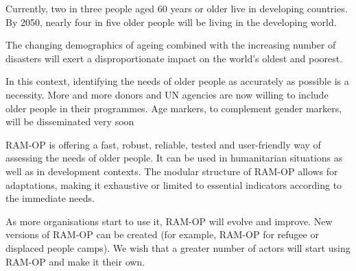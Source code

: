 \documentclass[12pt,a4paper]{book}
\theoremstyle{definition}
\theoremstyle{definition}
\theoremstyle{definition}
\theoremstyle{remark}
\begin{document}
Currently, two in three people aged 60 years or older live in developing
countries. By 2050, nearly four in five older people will be living in
the developing world.

The changing demographics of ageing combined with the increasing number
of disasters will exert a disproportionate impact on the world's oldest
and poorest.

In this context, identifying the needs of older people as accurately as
possible is a necessity. More and more donors and UN agencies are now
willing to include older people in their programmes. Age markers, to
complement gender markers, will be disseminated very soon

RAM-OP is offering a fast, robust, reliable, tested and user-friendly
way of assessing the needs of older people. It can be used in
humanitarian situations as well as in development contexts. The modular
structure of RAM-OP allows for adaptations, making it exhaustive or
limited to essential indicators according to the immediate needs.

As more organisations start to use it, RAM-OP will evolve and improve.
New versions of RAM-OP can be created (for example, RAM-OP for refugee
or displaced people camps). We wish that a greater number of actors will
start using RAM-OP and make it their own.


\end{document}

